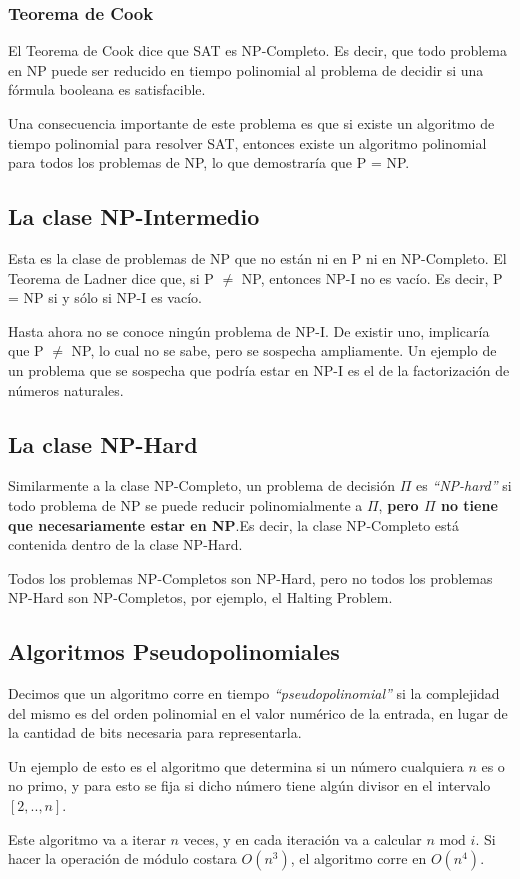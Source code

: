 \subsubsection{Teorema de Cook}

El Teorema de Cook dice que SAT es NP-Completo. Es decir, que todo problema en NP puede ser reducido en tiempo polinomial al problema de decidir si una f\'ormula booleana es satisfacible.

Una consecuencia importante de este problema es que si existe un algoritmo de tiempo polinomial para resolver SAT, entonces existe un algoritmo polinomial para todos los problemas de NP, lo que demostrar\'ia que P = NP.


\subsection{La clase NP-Intermedio}

Esta es la clase de problemas de NP que no est\'an ni en P ni en NP-Completo. El Teorema de Ladner dice que, si P $\neq$ NP, entonces NP-I no es vac\'io. Es decir, P = NP si y s\'olo si NP-I es vac\'io.

Hasta ahora no se conoce ning\'un problema de NP-I. De existir uno, implicar\'ia que P $\neq$ NP, lo cual no se sabe, pero se sospecha ampliamente. Un ejemplo de un problema que se sospecha que podr\'ia estar en NP-I es el de la factorizaci\'on de n\'umeros naturales.

\newpage
\subsection{La clase NP-Hard}

Similarmente a la clase NP-Completo, un problema de decisi\'on $\Pi$ es \emph{``NP-hard''} si todo problema de NP se puede reducir polinomialmente a $\Pi$, \textbf{pero $\Pi$ no tiene que necesariamente estar en NP}.Es decir, la clase NP-Completo est\'a contenida dentro de la clase NP-Hard. 

Todos los problemas NP-Completos son NP-Hard, pero no todos los problemas NP-Hard son NP-Completos, por ejemplo, el Halting Problem.

\subsection{Algoritmos Pseudopolinomiales}

Decimos que un algoritmo corre en tiempo \emph{``pseudopolinomial''} si la complejidad del mismo es del orden polinomial en el valor num\'erico de la entrada, en lugar de la cantidad de bits necesaria para representarla.

Un ejemplo de esto es el algoritmo que determina si un n\'umero cualquiera $n$ es o no primo, y para esto se fija si dicho n\'umero tiene alg\'un divisor en el intervalo $[2, .., n]$.

Este algoritmo va a iterar $n$ veces, y en cada iteraci\'on va a calcular $n \textrm{ mod } i$. Si hacer la operaci\'on de m\'odulo costara $O(n^3)$, el algoritmo corre en $O(n^4)$.